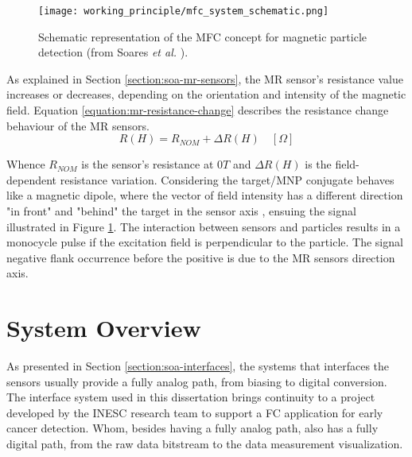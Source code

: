 \begin{figure}[!ht]
    \centering
    \texttt{[image: working\_principle/mfc\_system\_schematic.png]}
    \caption{Schematic representation of the MFC concept for magnetic particle detection (from Soares \textit{et al.} \cite{Soares2019}).}
    \label{figure:mfc-system-schematic}
\end{figure}

As explained in Section \ref{section:soa-mr-sensors}, the \ac{MR} sensor's resistance value increases or decreases, depending on the orientation and intensity of the magnetic field. Equation \ref{equation:mr-resistance-change} describes the resistance change behaviour of the \ac{MR} sensors. 
\begin{equation}
\label{equation:mr-resistance-change}
    R(H) = R_{NOM} + \Delta R(H) \quad [\Omega]
\end{equation}

\noindent
Whence $R_{NOM}$ is the sensor's resistance at $0T$ and $\Delta R(H)$ is the field-dependent resistance variation. Considering the target/\ac{MNP} conjugate behaves like a magnetic dipole, where the vector of field intensity has a different direction "in front" and "behind" the target in the sensor axis \cite{DiogoC_thesis}, ensuing the signal illustrated in Figure \ref{figure:mfc-system-schematic}. The interaction between sensors and particles results in a monocycle pulse if the excitation field is perpendicular to the particle. The signal negative flank occurrence before the positive is due to the \ac{MR} sensors direction axis.


\section{System Overview}
\label{section:mfc-system}

As presented in Section \ref{section:soa-interfaces}, the systems that interfaces the sensors usually provide a fully analog path, from biasing to digital conversion. The interface system used in this dissertation brings continuity to a project developed by the \ac{INESC} research team to support a \ac{FC} application for early cancer detection. Whom, besides having a fully analog path, also has a fully digital path, from the raw data bitstream to the data measurement visualization.

